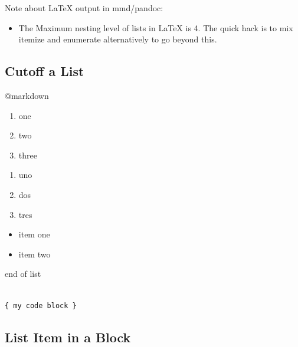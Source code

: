 Note about LaTeX output in mmd\slash pandoc:

\begin{itemize}
\item The Maximum nesting level of lists in LaTeX is 4. The quick hack is to mix itemize and enumerate alternatively to go beyond this.

\end{itemize}

\subsection{Cutoff a List}
\label{cutoffalist}

@markdown

\begin{enumerate}
\item one

\item two

\item three

\end{enumerate}

 

\begin{enumerate}
\item uno

\item dos

\item tres

\end{enumerate}

 

\begin{itemize}
\item item one

\item item two

\end{itemize}

 end of list 

\begin{adjustwidth}{2.5em}{2.5em}
\begin{verbatim}

{ my code block }

\end{verbatim}
\end{adjustwidth}

\subsection{List Item in a Block}
\label{listiteminablock}

